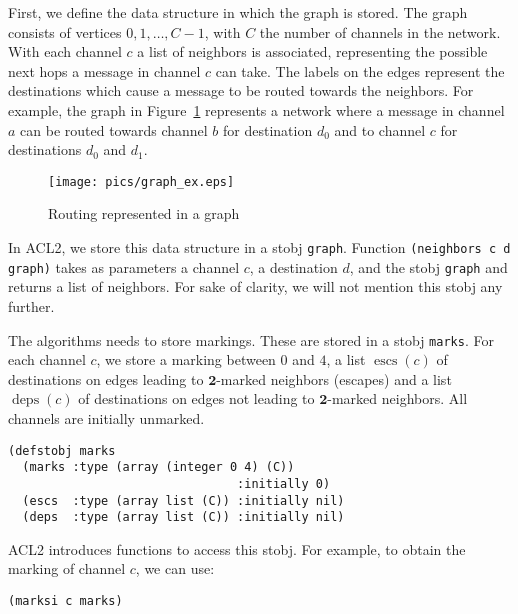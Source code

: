 \documentclass[submission,copyright]{eptcs}
\DeclareMathOperator{\escs}{escs}
\DeclareMathOperator{\deps}{deps}
\begin{document}
First, we define the data structure in which the graph is stored. The graph consists of vertices $0, 1, \ldots, C-1$, with $C$ the number of channels in the network. With each channel $c$ a list of neighbors is associated, representing the possible next hops a message in channel $c$ can take. The labels on the edges represent the destinations which cause a message to be routed towards the neighbors. For example, the graph in Figure~\ref{fig:graph} represents a network where a message in channel $a$ can be routed towards channel $b$ for destination $d_0$ and to channel $c$ for destinations $d_0$ and $d_1$. 

\begin{figure}[hbpt]
\centering
\texttt{[image: pics/graph\_ex.eps]}
\caption{Routing represented in a graph}
\label{fig:graph}
\end{figure}

In ACL2, we store this data structure in a stobj {\tt graph}. Function {\tt (neighbors c d graph)} takes as parameters a channel $c$, a destination $d$, and the stobj {\tt graph} and returns a list of neighbors. For sake of clarity, we will not mention this stobj any further.

The algorithms needs to store markings. These are stored in a stobj {\tt marks}. For each channel $c$, we store a marking between $0$ and $4$, a list $\escs(c)$ of destinations on edges leading to $\mathbf{2}$-marked neighbors (escapes) and a list $\deps(c)$ of destinations on edges not leading to $\mathbf{2}$-marked neighbors. All channels are initially unmarked.
\begin{verbatim}
(defstobj marks
  (marks :type (array (integer 0 4) (C))
                                :initially 0)
  (escs  :type (array list (C)) :initially nil)
  (deps  :type (array list (C)) :initially nil)
\end{verbatim}
ACL2 introduces functions to access this stobj. For example, to obtain the marking of channel $c$, we can use:
\begin{center}
{\tt (marksi c marks)}
\end{center}
\end{document}
